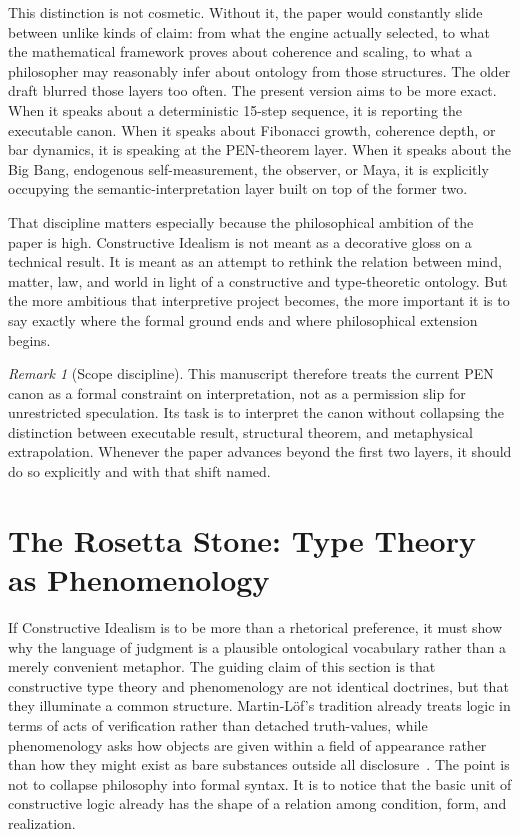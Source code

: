 \documentclass[11pt,a4paper]{article}
\theoremstyle{plain}
\theoremstyle{definition}
\theoremstyle{remark}
\newtheorem{remark}[theorem]{Remark}
\begin{document}
This distinction is not cosmetic.
Without it, the paper would constantly slide between unlike kinds of claim: from what the engine actually selected, to what the mathematical framework proves about coherence and scaling, to what a philosopher may reasonably infer about ontology from those structures.
The older draft blurred those layers too often.
The present version aims to be more exact.
When it speaks about a deterministic 15-step sequence, it is reporting the executable canon.
When it speaks about Fibonacci growth, coherence depth, or bar dynamics, it is speaking at the PEN-theorem layer.
When it speaks about the Big Bang, endogenous self-measurement, the observer, or Maya, it is explicitly occupying the semantic-interpretation layer built on top of the former two.

That discipline matters especially because the philosophical ambition of the paper is high.
Constructive Idealism is not meant as a decorative gloss on a technical result.
It is meant as an attempt to rethink the relation between mind, matter, law, and world in light of a constructive and type-theoretic ontology.
But the more ambitious that interpretive project becomes, the more important it is to say exactly where the formal ground ends and where philosophical extension begins.

\begin{remark}[Scope discipline]
\label{rem:scope-discipline}
This manuscript therefore treats the current PEN canon as a formal constraint on interpretation, not as a permission slip for unrestricted speculation.
Its task is to interpret the canon without collapsing the distinction between executable result, structural theorem, and metaphysical extrapolation.
Whenever the paper advances beyond the first two layers, it should do so explicitly and with that shift named.
\end{remark}

\section{The Rosetta Stone: Type Theory as Phenomenology}
\label{sec:rosetta}

If Constructive Idealism is to be more than a rhetorical preference, it must show why the language of judgment is a plausible ontological vocabulary rather than a merely convenient metaphor.
The guiding claim of this section is that constructive type theory and phenomenology are not identical doctrines, but that they illuminate a common structure.
Martin-L\"of's tradition already treats logic in terms of acts of verification rather than detached truth-values, while phenomenology asks how objects are given within a field of appearance rather than how they might exist as bare substances outside all disclosure~\cite{martin-lof,husserl}.
The point is not to collapse philosophy into formal syntax.
It is to notice that the basic unit of constructive logic already has the shape of a relation among condition, form, and realization.
\end{document}
